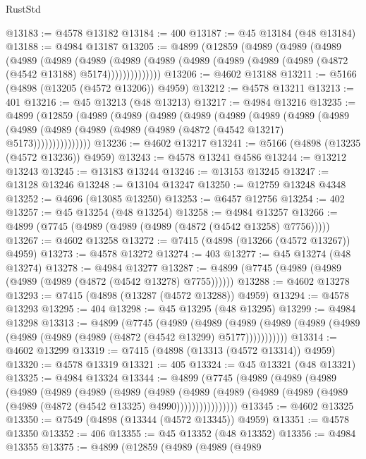 \begin{lexlean}{RustStd}
\begin{coremodule}
@13183 := @4578 @13182
@13184 := 400
@13187 := @45 @13184 (@48 @13184)
@13188 := @4984 @13187
@13205 := @4899
    (@12859
      (@4989
        (@4989
          (@4989
            (@4989
              (@4989
                (@4989
                  (@4989
                    (@4989 (@4989 (@4989 (@4989 (@4989 (@4872 (@4542 @13188) @5174))))))))))))))
@13206 := @4602 @13188
@13211 := @5166 (@4898 (@13205 (@4572 @13206)) @4959)
@13212 := @4578 @13211
@13213 := 401
@13216 := @45 @13213 (@48 @13213)
@13217 := @4984 @13216
@13235 := @4899
    (@12859
      (@4989
        (@4989
          (@4989
            (@4989
              (@4989
                (@4989
                  (@4989
                    (@4989
                      (@4989 (@4989 (@4989 (@4989 (@4989 (@4872 (@4542 @13217) @5173)))))))))))))))
@13236 := @4602 @13217
@13241 := @5166 (@4898 (@13235 (@4572 @13236)) @4959)
@13243 := @4578 @13241 @4586
@13244 := @13212 @13243
@13245 := @13183 @13244
@13246 := @13153 @13245
@13247 := @13128 @13246
@13248 := @13104 @13247
@13250 := @12759 @13248 @4348
@13252 := @4696 (@13085 @13250)
@13253 := @6457 @12756
@13254 := 402
@13257 := @45 @13254 (@48 @13254)
@13258 := @4984 @13257
@13266 := @4899 (@7745 (@4989 (@4989 (@4989 (@4872 (@4542 @13258) @7756)))))
@13267 := @4602 @13258
@13272 := @7415 (@4898 (@13266 (@4572 @13267)) @4959)
@13273 := @4578 @13272
@13274 := 403
@13277 := @45 @13274 (@48 @13274)
@13278 := @4984 @13277
@13287 := @4899 (@7745 (@4989 (@4989 (@4989 (@4989 (@4872 (@4542 @13278) @7755))))))
@13288 := @4602 @13278
@13293 := @7415 (@4898 (@13287 (@4572 @13288)) @4959)
@13294 := @4578 @13293
@13295 := 404
@13298 := @45 @13295 (@48 @13295)
@13299 := @4984 @13298
@13313 := @4899
    (@7745
      (@4989
        (@4989
          (@4989 (@4989 (@4989 (@4989 (@4989 (@4989 (@4989 (@4872 (@4542 @13299) @5177)))))))))))
@13314 := @4602 @13299
@13319 := @7415 (@4898 (@13313 (@4572 @13314)) @4959)
@13320 := @4578 @13319
@13321 := 405
@13324 := @45 @13321 (@48 @13321)
@13325 := @4984 @13324
@13344 := @4899
    (@7745
      (@4989
        (@4989
          (@4989
            (@4989
              (@4989
                (@4989
                  (@4989
                    (@4989
                      (@4989
                        (@4989
                          (@4989 (@4989 (@4989 (@4989 (@4872 (@4542 @13325) @4990))))))))))))))))
@13345 := @4602 @13325
@13350 := @7549 (@4898 (@13344 (@4572 @13345)) @4959)
@13351 := @4578 @13350
@13352 := 406
@13355 := @45 @13352 (@48 @13352)
@13356 := @4984 @13355
@13375 := @4899
    (@12859
      (@4989
        (@4989
          (@4989

\end{coremodule}
\end{lexlean}
